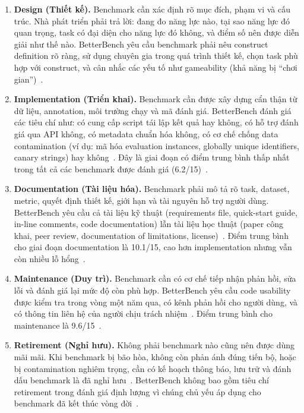 \begin{enumerate}
    \item \textbf{Design (Thiết kế).} Benchmark cần xác định rõ mục đích, phạm vi và cấu trúc. Nhà phát triển phải trả lời: đang đo năng lực nào, tại sao năng lực đó quan trọng, task có đại diện cho năng lực đó không, và điểm số nên được diễn giải như thế nào. BetterBench yêu cầu benchmark phải nêu construct definition rõ ràng, sử dụng chuyên gia trong quá trình thiết kế, chọn task phù hợp với construct, và cân nhắc các yếu tố như gameability (khả năng bị ``chơi gian'')~\cite{betterbench}.

    \item \textbf{Implementation (Triển khai).} Benchmark cần được xây dựng cẩn thận từ dữ liệu, annotation, môi trường chạy và mã đánh giá. BetterBench đánh giá các tiêu chí như: có cung cấp script tái lập kết quả hay không, có hỗ trợ đánh giá qua API không, có metadata chuẩn hóa không, có cơ chế chống data contamination (ví dụ: mã hóa evaluation instances, globally unique identifiers, canary strings) hay không~\cite{betterbench}. Đây là giai đoạn có điểm trung bình thấp nhất trong tất cả các benchmark được đánh giá (6.2/15)~\cite{betterbench}.

    \item \textbf{Documentation (Tài liệu hóa).} Benchmark phải mô tả rõ task, dataset, metric, quyết định thiết kế, giới hạn và tài nguyên hỗ trợ người dùng. BetterBench yêu cầu cả tài liệu kỹ thuật (requirements file, quick-start guide, in-line comments, code documentation) lẫn tài liệu học thuật (paper công khai, peer review, documentation of limitations, license)~\cite{betterbench}. Điểm trung bình cho giai đoạn documentation là 10.1/15, cao hơn implementation nhưng vẫn còn nhiều lỗ hổng~\cite{betterbench}.

    \item \textbf{Maintenance (Duy trì).} Benchmark cần có cơ chế tiếp nhận phản hồi, sửa lỗi và đánh giá lại mức độ còn phù hợp. BetterBench yêu cầu code usability được kiểm tra trong vòng một năm qua, có kênh phản hồi cho người dùng, và có thông tin liên hệ của người chịu trách nhiệm~\cite{betterbench}. Điểm trung bình cho maintenance là 9.6/15~\cite{betterbench}.

    \item \textbf{Retirement (Nghỉ hưu).} Không phải benchmark nào cũng nên được dùng mãi mãi. Khi benchmark bị bão hòa, không còn phản ánh đúng tiến bộ, hoặc bị contamination nghiêm trọng, cần có kế hoạch thông báo, lưu trữ và đánh dấu benchmark là đã nghỉ hưu~\cite{betterbench}. BetterBench không bao gồm tiêu chí retirement trong đánh giá định lượng vì chúng chủ yếu áp dụng cho benchmark đã kết thúc vòng đời~\cite{betterbench}.
\end{enumerate}

